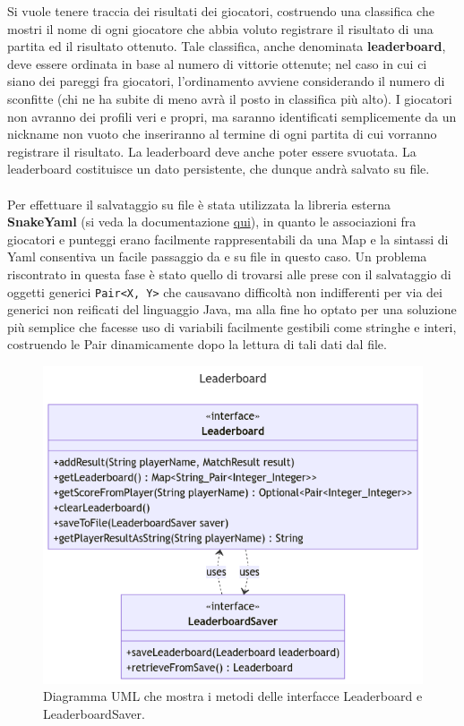 \documentclass[a4paper,12pt]{report}
\begin{document}
Si vuole tenere traccia dei risultati dei giocatori, costruendo una classifica che mostri il nome di ogni giocatore che abbia voluto registrare il risultato di una partita ed il risultato ottenuto. Tale classifica, anche denominata \textbf{leaderboard}, deve essere ordinata in base al numero di vittorie ottenute; nel caso in cui ci siano dei pareggi fra giocatori, l'ordinamento avviene considerando il numero di sconfitte (chi ne ha subite di meno avrà il posto in classifica più alto). I giocatori non avranno dei profili veri e propri, ma saranno identificati semplicemente da un nickname non vuoto che inseriranno al termine di ogni partita di cui vorranno registrare il risultato. La leaderboard deve anche poter essere svuotata. La leaderboard costituisce un dato persistente, che dunque andrà salvato su file.
\\\\
Per effettuare il salvataggio su file è stata utilizzata la libreria esterna \textbf{SnakeYaml} (si veda la documentazione \href{https://bitbucket.org/snakeyaml/snakeyaml/wiki/Documentation}{qui}), in quanto le associazioni fra giocatori e punteggi erano facilmente rappresentabili da una Map e la sintassi di Yaml consentiva un facile passaggio da e su file in questo caso. Un problema riscontrato in questa fase è stato quello di trovarsi alle prese con il salvataggio di oggetti generici \texttt{Pair<X, Y>} che causavano difficoltà non indifferenti per via dei generici non reificati del linguaggio Java, ma alla fine ho optato per una soluzione più semplice che facesse uso di variabili facilmente gestibili come stringhe e interi, costruendo le Pair dinamicamente dopo la lettura di tali dati dal file.

\begin{figure}[H]
	\centering
	\includegraphics[width=\textwidth]{images/leaderboard.png}
	\caption{Diagramma UML che mostra i metodi delle interfacce Leaderboard e LeaderboardSaver.}
	\label{images:leaderboard}
\end{figure}
\end{document}
